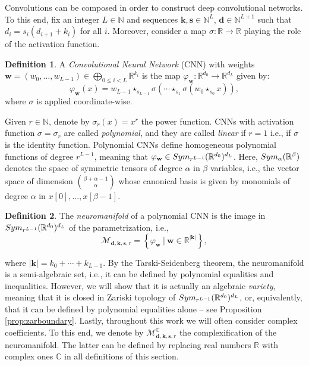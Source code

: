 \documentclass[twoside]{article}
\theoremstyle{plain}%
\theoremstyle{definition}
\newtheorem{defn}{Definition}
\theoremstyle{remark}
\newcommand{\symm}[2]{\textnormal{Sym}_{#1}(\mathbb{R}^{#2})}
\newcommand{\conv}[1]{\star_{#1}}
\begin{document}
Convolutions can be composed in order to construct deep convolutional networks. To this end, fix an integer $L \in \mathbb{N}$ and sequences $\mathbf{k}, \mathbf{s} \in \mathbb{N}^{L}$, $\mathbf{d} \in \mathbb{N}^{L+1}$ such that $d_i = s_i(d_{i+1} + k_i)$ for all $i$. Moreover, consider a map $\sigma \colon \mathbb{R} \rightarrow \mathbb{R}$ playing the role of the activation function. 
\begin{defn}
A \emph{Convolutional Neural Network} (CNN) with weights $\mathbf{w} = (w_{0}, \ldots, w_{L-1}) \in \bigoplus_{0 \leq i < L}\mathbb{R}^{k_i}$ is the map $\varphi_\mathbf{w} \colon \mathbb{R}^{d_0} \rightarrow \mathbb{R}^{d_L}$ given by:
\begin{equation}
\varphi_\mathbf{w}(x) = w_{L-1} \conv{s_{L-1}} \sigma \left(\cdots \conv{s_1}  \sigma ( w_0 \conv{s_{0}} x   ) \right),
\end{equation}
where $\sigma$ is applied coordinate-wise.
\end{defn}
Given $r \in \mathbb{N}$, denote by $\sigma_r(x) = x^r$ the power function. CNNs with activation function $\sigma = \sigma_r$ are called \emph{polynomial}, and they are called \emph{linear} if $r = 1$ i.e., if $\sigma$ is the identity function. Polynomial CNNs define homogeneous polynomial functions of degree $r^{L-1}$, meaning that $\varphi_\mathbf{w} \in \symm{r^{L-1}}{d_0}^{d_L}$. Here, $\symm{\alpha}{\beta}$ denotes the space of symmetric tensors of degree $\alpha$ in $\beta$ variables, i.e., the vector space of dimension $\binom{\beta + \alpha - 1}{\alpha}$ whose canonical basis is given by monomials of degree $\alpha$ in $x[0], \ldots, x[\beta -1]$. 
\begin{defn}
The \emph{neuromanifold} of a polynomial CNN is the image in $\symm{r^{L-1}}{d_0}^{d_L}$ of the parametrization, i.e.,
\begin{equation}
\mathcal{M}_{\mathbf{d}, \mathbf{k}, \mathbf{s}, r} = \left\{\varphi_\mathbf{w} \ | \  \mathbf{w} \in \mathbb{R}^{|\mathbf{k}|} \right\}, 
\end{equation}
\end{defn}
where $|\mathbf{k}| = k_0 + \cdots + k_{L-1}$. By the Tarski-Seidenberg theorem, the neuromanifold is a semi-algebraic set, i.e., it can be defined by polynomial equalities and inequalities. However, we will show that it is actually an algebraic \emph{variety}, meaning that it is closed in Zariski topology of $\symm{r^{L-1}}{d_0}^{d_L}$, or, equivalently, that it can be defined by polynomial equalities alone -- see Proposition \ref{prop:zarboundary}. Lastly, throughout this work we will often consider complex coefficients. To this end, we denote by $\mathcal{M}_{\mathbf{d}, \mathbf{k}, \mathbf{s}, r}^\mathbb{C}$ the complexification of the neuromanifold. The latter can be defined by replacing real numbers $\mathbb{R}$ with complex ones $\mathbb{C}$ in all  definitions of this section. 
\end{document}
